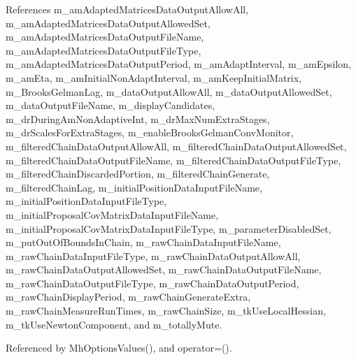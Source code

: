 References m\-\_\-am\-Adapted\-Matrices\-Data\-Output\-Allow\-All, m\-\_\-am\-Adapted\-Matrices\-Data\-Output\-Allowed\-Set, m\-\_\-am\-Adapted\-Matrices\-Data\-Output\-File\-Name, m\-\_\-am\-Adapted\-Matrices\-Data\-Output\-File\-Type, m\-\_\-am\-Adapted\-Matrices\-Data\-Output\-Period, m\-\_\-am\-Adapt\-Interval, m\-\_\-am\-Epsilon, m\-\_\-am\-Eta, m\-\_\-am\-Initial\-Non\-Adapt\-Interval, m\-\_\-am\-Keep\-Initial\-Matrix, m\-\_\-\-Brooks\-Gelman\-Lag, m\-\_\-data\-Output\-Allow\-All, m\-\_\-data\-Output\-Allowed\-Set, m\-\_\-data\-Output\-File\-Name, m\-\_\-display\-Candidates, m\-\_\-dr\-During\-Am\-Non\-Adaptive\-Int, m\-\_\-dr\-Max\-Num\-Extra\-Stages, m\-\_\-dr\-Scales\-For\-Extra\-Stages, m\-\_\-enable\-Brooks\-Gelman\-Conv\-Monitor, m\-\_\-filtered\-Chain\-Data\-Output\-Allow\-All, m\-\_\-filtered\-Chain\-Data\-Output\-Allowed\-Set, m\-\_\-filtered\-Chain\-Data\-Output\-File\-Name, m\-\_\-filtered\-Chain\-Data\-Output\-File\-Type, m\-\_\-filtered\-Chain\-Discarded\-Portion, m\-\_\-filtered\-Chain\-Generate, m\-\_\-filtered\-Chain\-Lag, m\-\_\-initial\-Position\-Data\-Input\-File\-Name, m\-\_\-initial\-Position\-Data\-Input\-File\-Type, m\-\_\-initial\-Proposal\-Cov\-Matrix\-Data\-Input\-File\-Name, m\-\_\-initial\-Proposal\-Cov\-Matrix\-Data\-Input\-File\-Type, m\-\_\-parameter\-Disabled\-Set, m\-\_\-put\-Out\-Of\-Bounds\-In\-Chain, m\-\_\-raw\-Chain\-Data\-Input\-File\-Name, m\-\_\-raw\-Chain\-Data\-Input\-File\-Type, m\-\_\-raw\-Chain\-Data\-Output\-Allow\-All, m\-\_\-raw\-Chain\-Data\-Output\-Allowed\-Set, m\-\_\-raw\-Chain\-Data\-Output\-File\-Name, m\-\_\-raw\-Chain\-Data\-Output\-File\-Type, m\-\_\-raw\-Chain\-Data\-Output\-Period, m\-\_\-raw\-Chain\-Display\-Period, m\-\_\-raw\-Chain\-Generate\-Extra, m\-\_\-raw\-Chain\-Measure\-Run\-Times, m\-\_\-raw\-Chain\-Size, m\-\_\-tk\-Use\-Local\-Hessian, m\-\_\-tk\-Use\-Newton\-Component, and m\-\_\-totally\-Mute.



Referenced by Mh\-Options\-Values(), and operator=().


